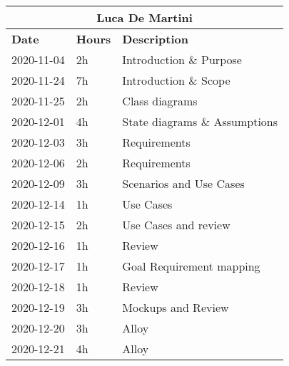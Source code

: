 
\begin{table}[H]
    \centering
    \begin{tabular}{|l|l|l|}
        \multicolumn{3}{c}{\textbf{Luca De Martini}}                   \\
        \hline
        \textbf{Date} & \textbf{Hours} & \textbf{Description}          \\\hline
        2020-11-04    & 2h             & Introduction \& Purpose       \\\hline
        2020-11-24    & 7h             & Introduction \& Scope         \\\hline
        2020-11-25    & 2h             & Class diagrams                \\\hline
        2020-12-01    & 4h             & State diagrams \& Assumptions \\\hline
        2020-12-03    & 3h             & Requirements                  \\\hline
        2020-12-06    & 2h             & Requirements                  \\\hline
        2020-12-09    & 3h             & Scenarios and Use Cases       \\\hline
        2020-12-14    & 1h             & Use Cases                     \\\hline
        2020-12-15    & 2h             & Use Cases and review          \\\hline
        2020-12-16    & 1h             & Review                        \\\hline
        2020-12-17    & 1h             & Goal Requirement mapping      \\\hline
        2020-12-18    & 1h             & Review                        \\\hline
        2020-12-19    & 3h             & Mockups and Review            \\\hline
        2020-12-20    & 3h             & Alloy                         \\\hline
        2020-12-21    & 4h             & Alloy                         \\\hline 
    \end{tabular}
\end{table}

